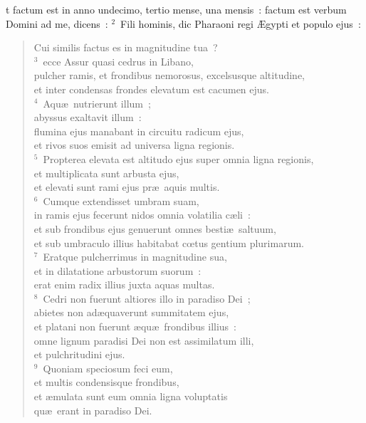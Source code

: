 \bchapter
{}t factum est in anno undecimo, tertio mense, una mensis~: factum est verbum Domini ad me, dicens~:
${}^{2}$~Fili hominis, dic Pharaoni regi \AE gypti et populo ejus~: \begin{flushleft}\begin{verse}Cui similis factus es in magnitudine tua~?\\
${}^{3}$~ecce Assur quasi cedrus in Libano,\\ pulcher ramis, et frondibus nemorosus, excelsusque altitudine,\\ et inter condensas frondes elevatum est cacumen ejus.\\
${}^{4}$~Aqu\ae\ nutrierunt illum~;\\ abyssus exaltavit illum~:\\ flumina ejus manabant in circuitu radicum ejus,\\ et rivos suos emisit ad universa ligna regionis.\\
${}^{5}$~Propterea elevata est altitudo ejus super omnia ligna regionis,\\ et multiplicata sunt arbusta ejus,\\ et elevati sunt rami ejus pr\ae\ aquis multis.\\
${}^{6}$~Cumque extendisset umbram suam,\\ in ramis ejus fecerunt nidos omnia volatilia c\ae li~:\\ et sub frondibus ejus genuerunt omnes besti\ae\ saltuum,\\ et sub umbraculo illius habitabat cœtus gentium plurimarum.\\
${}^{7}$~Eratque pulcherrimus in magnitudine sua,\\ et in dilatatione arbustorum suorum~:\\ erat enim radix illius juxta aquas multas.\\
${}^{8}$~Cedri non fuerunt altiores illo in paradiso Dei~;\\ abietes non ad\ae quaverunt summitatem ejus,\\ et platani non fuerunt \ae qu\ae\ frondibus illius~:\\ omne lignum paradisi Dei non est assimilatum illi,\\ et pulchritudini ejus.\\
${}^{9}$~Quoniam speciosum feci eum,\\ et multis condensisque frondibus,\\ et \ae mulata sunt eum omnia ligna voluptatis\\ qu\ae\ erant in paradiso Dei.\end{verse}\end{flushleft}


